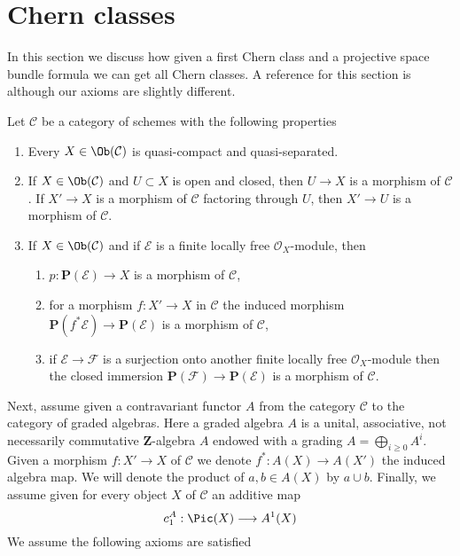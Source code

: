 \section{Chern classes}
\label{section-chern}

\noindent
In this section we discuss how given a first Chern class and a projective
space bundle formula we can get all Chern classes.
A reference for this section is \cite{Grothendieck-chern} although our
axioms are slightly different.

\medskip\noindent
Let $\mathcal{C}$ be a category of schemes with the following properties
\begin{enumerate}
\item Every $X \in \Ob(\mathcal{C})$ is quasi-compact and quasi-separated.
\item If $X \in \Ob(\mathcal{C})$ and $U \subset X$ is open and closed,
then $U \to X$ is a morphism of $\mathcal{C}$. If $X' \to X$ is a morphism
of $\mathcal{C}$ factoring through $U$, then $X' \to U$ is a morphism
of $\mathcal{C}$.
\item If $X \in \Ob(\mathcal{C})$ and if $\mathcal{E}$ is a finite
locally free $\mathcal{O}_X$-module, then
\begin{enumerate}
\item $p : \mathbf{P}(\mathcal{E}) \to X$ is a morphism of $\mathcal{C}$,
\item for a morphism $f : X' \to X$ in $\mathcal{C}$ the
induced morphism $\mathbf{P}(f^*\mathcal{E}) \to \mathbf{P}(\mathcal{E})$
is a morphism of $\mathcal{C}$,
\item if $\mathcal{E} \to \mathcal{F}$ is a surjection onto another finite
locally free $\mathcal{O}_X$-module then the closed immersion
$\mathbf{P}(\mathcal{F}) \to \mathbf{P}(\mathcal{E})$
is a morphism of $\mathcal{C}$.
\end{enumerate}
\end{enumerate}
Next, assume given a contravariant functor $A$ from the
category $\mathcal{C}$ to the category of graded algebras.
Here a graded algebra $A$ is a unital, associative,
not necessarily commutative $\mathbf{Z}$-algebra $A$ endowed with a grading
$A = \bigoplus_{i \geq 0} A^i$. Given a morphism
$f : X' \to X$ of $\mathcal{C}$ we denote $f^* : A(X) \to A(X')$ the
induced algebra map.
We will denote the product of $a, b \in A(X)$ by $a \cup b$.
Finally, we assume
given for every object $X$ of $\mathcal{C}$ an additive  map
$$
c_1^A : \Pic(X) \longrightarrow A^1(X)
$$
We assume the following axioms are satisfied
